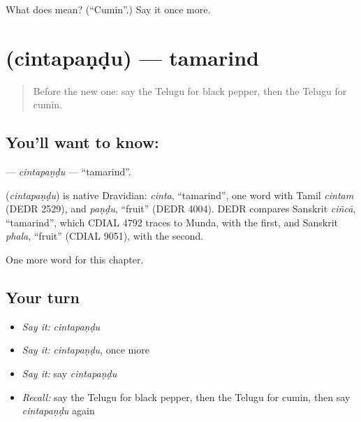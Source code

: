 \begin{tcolorbox}[breakable,colback=teal!4,colframe=teal!35!black,title={Before you move on}]
What does  mean? (\textquotedblleft{}Cumin\textquotedblright{}.) Say it once more.
\end{tcolorbox}
\section[\texorpdfstring{\te{చింతపండు} (cintapaṇḍu)}{చింతపండు (cintapaṇḍu)}]{ (cintapaṇḍu) — tamarind}

\label{lesson:TE-C135-cintapandu}



\begin{quote}
Before the new one: say the Telugu for black pepper, then the Telugu for cumin.
\end{quote}

\subsection*{You'll want to know: }
\textbf{} — \emph{cintapaṇḍu} — \textquotedblleft{}tamarind\textquotedblright{}.

\begin{cousinweb}
\textbf{} (\emph{cintapaṇḍu}) is native Dravidian: \emph{cinta}, \textquotedblleft{}tamarind\textquotedblright{}, one word with Tamil \emph{cintam} (DEDR 2529), and \emph{paṇḍu}, \textquotedblleft{}fruit\textquotedblright{} (DEDR 4004). DEDR compares Sanskrit \emph{ciñcā}, \textquotedblleft{}tamarind\textquotedblright{}, which CDIAL 4792 traces to Munda, with the first, and Sanskrit \emph{phala}, \textquotedblleft{}fruit\textquotedblright{} (CDIAL 9051), with the second.
\end{cousinweb}

\begin{grammarlens}[title={What you've built}]
One more word for this chapter.
\end{grammarlens}

\subsection*{Your turn}
\begin{itemize}
\raggedright
  \item \emph{Say it:} \emph{cintapaṇḍu}
  \item \emph{Say it:} \emph{cintapaṇḍu}, once more
  \item \emph{Say it:} say \emph{cintapaṇḍu}
  \item \emph{Recall:} say the Telugu for black pepper, then the Telugu for cumin, then say \emph{cintapaṇḍu} again
\end{itemize}

